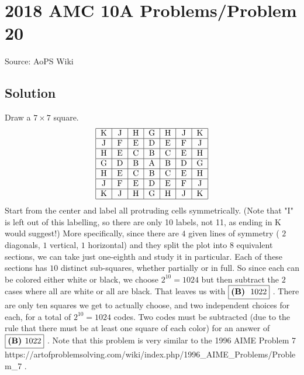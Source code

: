 \documentclass[12pt]{article}
\begin{document}
\section*{{2018 AMC 10A Problems/Problem 20}}
Source: AoPS Wiki

\subsection*{Solution}
Draw a $7 \times 7$ square. \[\begin{tabular}{|c|c|c|c|c|c|c|} \hline K & J & H & G & H & J & K \\ \hline J & F & E & D & E & F & J \\ \hline H & E & C & B & C & E & H \\ \hline G & D & B & A & B & D & G \\ \hline H & E & C & B & C & E & H \\ \hline J & F & E & D & E & F & J \\ \hline K & J & H & G & H & J & K \\ \hline \end{tabular}\] Start from the center and label all protruding cells symmetrically. (Note that "I" is left out of this labelling, so there are only 10 labels, not 11, as ending in K would suggest!) More specifically, since there are $4$ given lines of symmetry ( $2$ diagonals, $1$ vertical, $1$ horizontal) and they split the plot into $8$ equivalent sections, we can take just one-eighth and study it in particular. Each of these sections has $10$ distinct sub-squares, whether partially or in full. So since each can be colored either white or black, we choose $2^{10}=1024$ but then subtract the $2$ cases where all are white or all are black. That leaves us with $\fbox{\textbf{(B)} \text{ 1022}}$ . There are only ten squares we get to actually choose, and two independent choices for each, for a total of $2^{10} = 1024$ codes. Two codes must be subtracted (due to the rule that there must be at least one square of each color) for an answer of $\fbox{\textbf{(B) }1022}$ . Note that this problem is very similar to the 1996 AIME Problem 7 https://artofproblemsolving.com/wiki/index.php/1996_AIME_Problems/Problem_7 .
\end{document}
